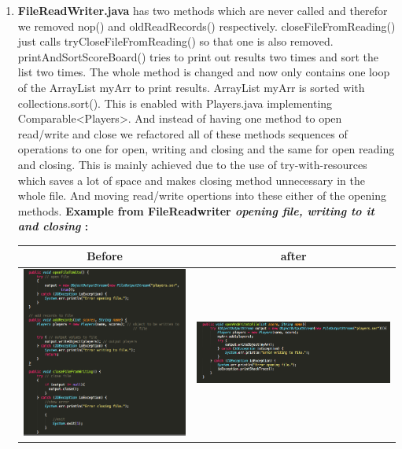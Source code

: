 \documentclass{article}
\begin{document}
\begin{enumerate}
	\item
	\textbf{FileReadWriter.java}
	has two methods which are never called and therefor we removed nop() and oldReadRecords() respectively.
	closeFileFromReading() just calls tryCloseFileFromReading() so that one is also removed.
	printAndSortScoreBoard() tries to print out results two times and sort the list two times.
	The whole method is changed and now only contains one loop of the ArrayList myArr to print results. ArrayList myArr is sorted with collections.sort(). This is enabled with Players.java implementing Comparable<Players>.
	And instead of having one method to open read/write and close we refactored all of these methods sequences of operations to one for open, writing and closing and the same for open reading and closing. This is mainly achieved due to the use of try-with-resources which saves a lot of space and makes closing method unnecessary in the whole file. And moving read/write opertions into these either of the opening methods. 
	\textbf{Example from FileReadwriter \textit{opening file, writing to it and closing} :\newline}
	\hspace*{-2.0cm}\begin{tabulary}{0.5\textwidth}{| c | c |}
	 \hline
	 Before & after \\ \hline
	\includegraphics[scale=0.4]{FileReadWriter-EXAMPLE-BEFORE.png} & \includegraphics[scale=0.4]{FileReaderWriter-EXAMPLE-AFTER.png} \\ \hline
	\end{tabulary}


\end{enumerate}
\end{document}
